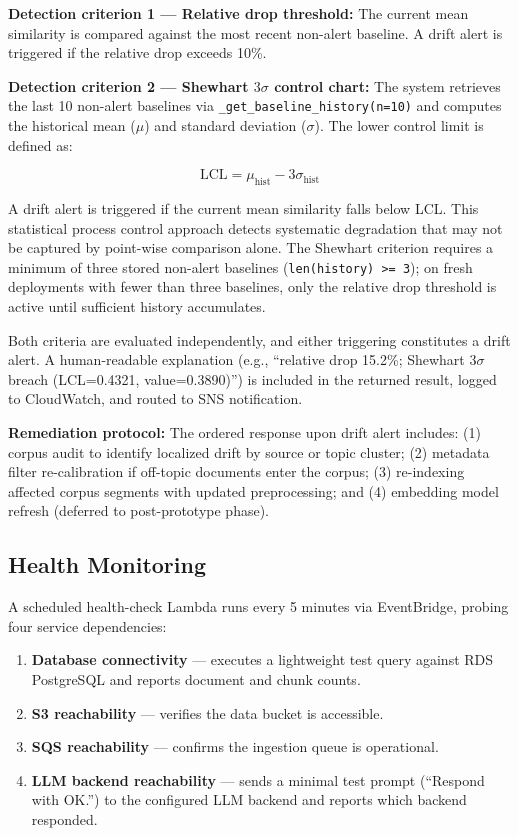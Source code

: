 \textbf{Detection criterion 1 --- Relative drop threshold:} The current mean similarity is compared against the most recent non-alert baseline. A drift alert is triggered if the relative drop exceeds 10\%.

\textbf{Detection criterion 2 --- Shewhart $3\sigma$ control chart:} The system retrieves the last 10 non-alert baselines via \texttt{\_get\_baseline\_history(n=10)} and computes the historical mean ($\mu$) and standard deviation ($\sigma$). The lower control limit is defined as:

\begin{equation}
  \text{LCL} = \mu_{\text{hist}} - 3\sigma_{\text{hist}}
  \label{eq:shewhart}
\end{equation}

A drift alert is triggered if the current mean similarity falls below LCL. This statistical process control approach detects systematic degradation that may not be captured by point-wise comparison alone. The Shewhart criterion requires a minimum of three stored non-alert baselines (\texttt{len(history) >= 3}); on fresh deployments with fewer than three baselines, only the relative drop threshold is active until sufficient history accumulates.

Both criteria are evaluated independently, and either triggering constitutes a drift alert. A human-readable explanation (e.g., ``relative drop 15.2\%; Shewhart $3\sigma$ breach (LCL=0.4321, value=0.3890)'') is included in the returned result, logged to CloudWatch, and routed to SNS notification.

\textbf{Remediation protocol:} The ordered response upon drift alert includes: (1) corpus audit to identify localized drift by source or topic cluster; (2) metadata filter re-calibration if off-topic documents enter the corpus; (3) re-indexing affected corpus segments with updated preprocessing; and (4) embedding model refresh (deferred to post-prototype phase).

\subsection{Health Monitoring}

A scheduled health-check Lambda runs every 5 minutes via EventBridge, probing four service dependencies:

\begin{enumerate}[leftmargin=0.5in]
  \item \textbf{Database connectivity} --- executes a lightweight test query against RDS PostgreSQL and reports document and chunk counts.
  \item \textbf{S3 reachability} --- verifies the data bucket is accessible.
  \item \textbf{SQS reachability} --- confirms the ingestion queue is operational.
  \item \textbf{LLM backend reachability} --- sends a minimal test prompt (``Respond with OK.'') to the configured LLM backend and reports which backend responded.
\end{enumerate}

